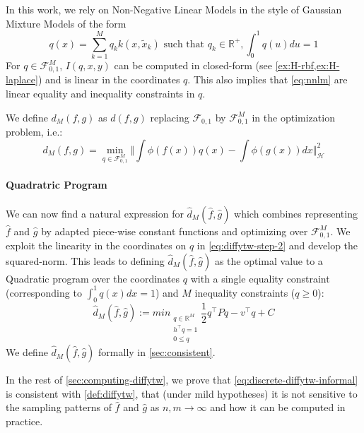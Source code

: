 In this work, we rely on Non-Negative Linear Models in the style of Gaussian Mixture Models of the form
\begin{equation}\label{eq:nnlm}
q(x) = \sum_{k=1}^M q_k k(x, \tilde x_k)\text{ such that } q_k\in\mathbb R^+, \int_0^1q(u)du=1
\end{equation}
For $q\in\mathcal F_{0,1}^M$, $I(q, x, y)$ can be computed in closed-form (see \cref{ex:H-rbf,ex:H-laplace}) and is linear in the coordinates $q$. This also implies that \cref{eq:nnlm} are linear equality and inequality constraints in $q$.

We define $d_M(f, g)$ as $d(f,g)$ replacing $\mathcal F_{0,1}$ by $\mathcal F_{0,1}^M$ in the optimization problem, i.e.:
\begin{equation}\label{eq:hat-d_M}
d_M(f, g) = \min_{q \in\mathcal F_{0,1}^M} \Vert \int \phi(f(x))q(x) - \int \phi(g(x))dx\Vert_\mathcal H^2
\end{equation}

\paragraph{Quadratric Program} We can now find a natural expression for $\hat d_M(\hat f, \hat g)$ which combines representing $\hat f$ and $\hat g$ by adapted piece-wise constant functions and optimizing over $\mathcal F_{0,1}^M$. We exploit the linearity in the coordinates on $q$ in \cref{eq:diffytw-step-2} and develop the squared-norm. This leads to defining $\hat d_M(\hat f, \hat g)$ as the optimal value to a Quadratic program over the coordinates $q$ with a single equality constraint (corresponding to $\int_0^1q(x)dx = 1$) and $M$ inequality constraints ($q \geq 0$):
\begin{equation}\label{eq:discrete-diffytw-informal}
\hat d_M(\hat f, \hat g) :=min_{\substack{q\in\mathbb R^{M}\\h^\top q=1\\0 \leq q}}\frac{1}{2}q^\top Pq - v^\top q + C
\end{equation}
We define $\hat d_M(\hat f, \hat g)$ formally in \cref{sec:consistent}.

In the rest of \cref{sec:computing-diffytw}, we prove that \cref{eq:discrete-diffytw-informal} is consistent with \cref{def:diffytw}, that (under mild hypotheses) it is not sensitive to the sampling patterns of $\hat f$ and $\hat g$ as $n, m\to\infty$ and how it can be computed in practice.

